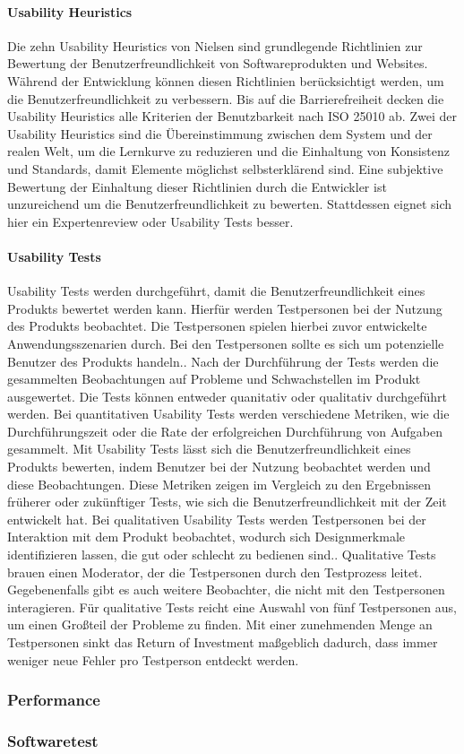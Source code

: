 \paragraph{Usability Heuristics}
Die zehn Usability Heuristics von Nielsen sind grundlegende Richtlinien zur Bewertung der Benutzerfreundlichkeit von Softwareprodukten und Websites. Während der Entwicklung können diesen Richtlinien berücksichtigt werden, um die Benutzerfreundlichkeit zu verbessern. Bis auf die Barrierefreiheit decken die Usability Heuristics alle Kriterien der Benutzbarkeit nach ISO 25010 ab. Zwei der Usability Heuristics sind die Übereinstimmung zwischen dem System und der realen Welt, um die Lernkurve zu reduzieren und die Einhaltung von Konsistenz und Standards, damit Elemente möglichst selbsterklärend sind.
Eine subjektive Bewertung der Einhaltung dieser Richtlinien durch die Entwickler ist unzureichend um die Benutzerfreundlichkeit zu bewerten. Stattdessen eignet sich hier ein Expertenreview oder Usability Tests besser.

\paragraph{Usability Tests}
Usability Tests werden durchgeführt, damit die Benutzerfreundlichkeit eines Produkts bewertet werden kann. Hierfür werden Testpersonen bei der Nutzung des Produkts beobachtet. Die Testpersonen spielen hierbei zuvor entwickelte Anwendungsszenarien durch. Bei den Testpersonen sollte es sich um potenzielle Benutzer des Produkts handeln.\cite[S.~22]{Dumas.1999}. Nach der Durchführung der Tests werden die gesammelten Beobachtungen auf Probleme und Schwachstellen im Produkt ausgewertet. Die Tests können entweder quanitativ oder qualitativ durchgeführt werden. Bei quantitativen Usability Tests werden verschiedene Metriken, wie die Durchführungszeit oder die Rate der erfolgreichen Durchführung von Aufgaben gesammelt.
Mit Usability Tests lässt sich die Benutzerfreundlichkeit eines Produkts bewerten, indem Benutzer bei der Nutzung beobachtet werden und diese Beobachtungen. Diese Metriken zeigen im Vergleich zu den Ergebnissen früherer oder zukünftiger Tests, wie sich die Benutzerfreundlichkeit mit der Zeit entwickelt hat. Bei qualitativen Usability Tests werden Testpersonen bei der Interaktion mit dem Produkt beobachtet, wodurch sich Designmerkmale identifizieren lassen, die gut oder schlecht zu bedienen sind.\cite{Budiu.2017}. Qualitative Tests brauen einen Moderator, der die Testpersonen durch den Testprozess leitet. Gegebenenfalls gibt es auch weitere Beobachter, die nicht mit den Testpersonen interagieren.\cite{Moran.2019} Für qualitative Tests reicht eine Auswahl von fünf Testpersonen aus, um einen Großteil der Probleme zu finden. Mit einer zunehmenden Menge an Testpersonen sinkt das Return of Investment maßgeblich dadurch, dass immer weniger neue Fehler pro Testperson entdeckt werden.\cite{Nielsen.2012}

\subsubsection{Performance}

\subsubsection{Softwaretest}